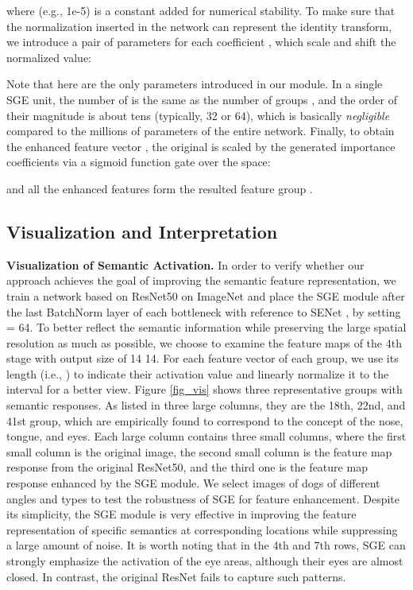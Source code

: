 \documentclass{article}
\begin{document}
	where  (e.g., 1e-5) is a constant added for numerical stability. To make sure that the normalization inserted in the network can represent the identity transform, we introduce a pair of parameters  for each coefficient , which scale and shift the normalized value:
	
	Note that  here are the only parameters introduced in our module. In a single SGE unit, the number of  is the same as the number of groups , and the order of their magnitude is about tens (typically, 32 or 64), which is basically \emph{negligible} compared to the millions of parameters of the entire network. Finally, to obtain the enhanced feature vector , the original  is scaled by the generated importance coefficients  via a sigmoid function gate  over the space:
	
	and all the enhanced features form the resulted feature group .
	

	

	\subsection{Visualization and Interpretation}
	\textbf{Visualization of Semantic Activation. }
	In order to verify whether our approach achieves the goal of improving the semantic feature representation, we train a network based on ResNet50 on ImageNet \cite{russakovsky2015imagenet} and place the SGE module after the last BatchNorm \cite{ioffe2015batch} layer of each bottleneck with reference to SENet \cite{hu2018squeeze}, by setting  = 64. To better reflect the semantic information while preserving the large spatial resolution as much as possible, we choose to examine the feature maps of the 4th stage with output size of 14  14. For each feature vector of each group, we use its length (i.e., ) to indicate their activation value and linearly normalize it to the interval  for a better view. Figure \ref{fig_vis} shows three representative groups with semantic responses. As listed in three large columns, they are the 18th, 22nd, and 41st group, which are empirically found to correspond to the concept of the nose, tongue, and eyes. Each large column contains three small columns, where the first small column is the original image, the second small column is the feature map response from the original ResNet50, and the third one is the feature map response enhanced by the SGE module. We select images of dogs of different angles and types to test the robustness of SGE for feature enhancement. Despite its simplicity, the SGE module is very effective in improving the feature representation of specific semantics at corresponding locations while suppressing a large amount of noise. It is worth noting that in the 4th and 7th rows, SGE can strongly emphasize the activation of the eye areas, although their eyes are almost closed. In contrast, the original ResNet fails to capture such patterns. 
	
\end{document}
